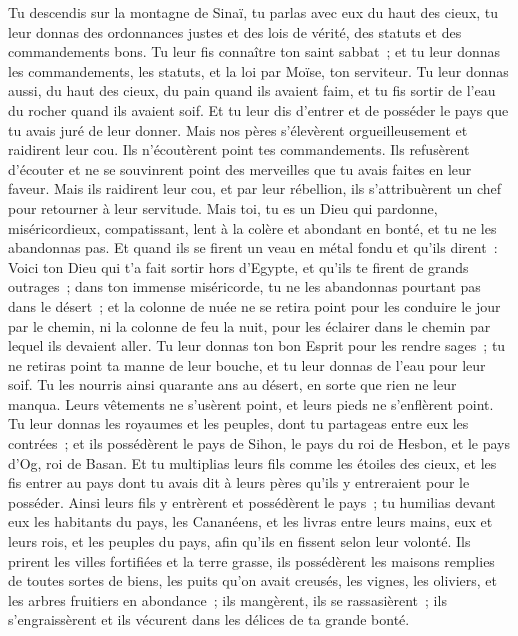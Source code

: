 \begin{multicols}{2}
Tu descendis sur la montagne de Sinaï, tu parlas avec eux du haut des cieux, tu leur donnas des ordonnances justes et des lois de vérité, des statuts et des commandements bons.
Tu leur fis connaître ton saint sabbat~; et tu leur donnas les commandements, les statuts, et la loi par Moïse, ton serviteur.
Tu leur donnas aussi, du haut des cieux, du pain quand ils avaient faim, et tu fis sortir de l'eau du rocher quand ils avaient soif. Et tu leur dis d'entrer et de posséder le pays que tu avais juré de leur donner.
Mais nos pères s'élevèrent orgueilleusement et raidirent leur cou. Ils n'écoutèrent point tes commandements.
Ils refusèrent d'écouter et ne se souvinrent point des merveilles que tu avais faites en leur faveur. Mais ils raidirent leur cou, et par leur rébellion, ils s'attribuèrent un chef pour retourner à leur servitude. Mais toi, tu es un Dieu qui pardonne, miséricordieux, compatissant, lent à la colère et abondant en bonté, et tu ne les abandonnas pas.
Et quand ils se firent un veau en métal fondu et qu'ils dirent~: Voici ton Dieu qui t'a fait sortir hors d'Egypte, et qu'ils te firent de grands outrages~;
dans ton immense miséricorde, tu ne les abandonnas pourtant pas dans le désert~; et la colonne de nuée ne se retira point pour les conduire le jour par le chemin, ni la colonne de feu la nuit, pour les éclairer dans le chemin par lequel ils devaient aller.
Tu leur donnas ton bon Esprit pour les rendre sages~; tu ne retiras point ta manne de leur bouche, et tu leur donnas de l'eau pour leur soif.
Tu les nourris ainsi quarante ans au désert, en sorte que rien ne leur manqua. Leurs vêtements ne s'usèrent point, et leurs pieds ne s'enflèrent point.
Tu leur donnas les royaumes et les peuples, dont tu partageas entre eux les contrées~; et ils possédèrent le pays de Sihon, le pays du roi de Hesbon, et le pays d'Og, roi de Basan.
Et tu multiplias leurs fils comme les étoiles des cieux, et les fis entrer au pays dont tu avais dit à leurs pères qu'ils y entreraient pour le posséder.
Ainsi leurs fils y entrèrent et possédèrent le pays~; tu humilias devant eux les habitants du pays, les Cananéens, et les livras entre leurs mains, eux et leurs rois, et les peuples du pays, afin qu'ils en fissent selon leur volonté.
Ils prirent les villes fortifiées et la terre grasse, ils possédèrent les maisons remplies de toutes sortes de biens, les puits qu'on avait creusés, les vignes, les oliviers, et les arbres fruitiers en abondance~; ils mangèrent, ils se rassasièrent~; ils s'engraissèrent et ils vécurent dans les délices de ta grande bonté.

\end{multicols}
